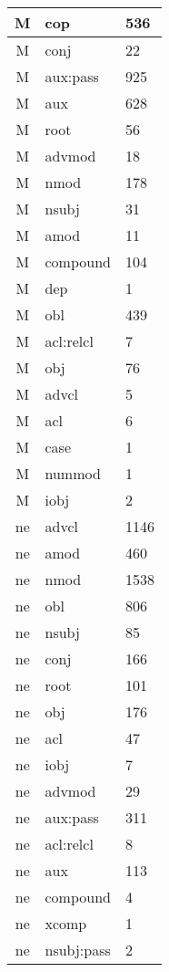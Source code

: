 \documentclass[a4 paper]{article}
\begin{document}
\begin{longtable}{cp{}p{}}
M & cop & 536\\ \midrule M & conj & 22\\ \midrule M & aux:pass & 925\\ \midrule M & aux & 628\\ \midrule M & root & 56\\ \midrule M & advmod & 18\\ \midrule M & nmod & 178\\ \midrule M & nsubj & 31\\ \midrule M & amod & 11\\ \midrule M & compound & 104\\ \midrule M & dep & 1\\ \midrule M & obl & 439\\ \midrule M & acl:relcl & 7\\ \midrule M & obj & 76\\ \midrule M & advcl & 5\\ \midrule M & acl & 6\\ \midrule M & case & 1\\ \midrule M & nummod & 1\\ \midrule M & iobj & 2\\ \midrule 
ne & advcl & 1146\\ \midrule ne & amod & 460\\ \midrule ne & nmod & 1538\\ \midrule ne & obl & 806\\ \midrule ne & nsubj & 85\\ \midrule ne & conj & 166\\ \midrule ne & root & 101\\ \midrule ne & obj & 176\\ \midrule ne & acl & 47\\ \midrule ne & iobj & 7\\ \midrule ne & advmod & 29\\ \midrule ne & aux:pass & 311\\ \midrule ne & acl:relcl & 8\\ \midrule ne & aux & 113\\ \midrule ne & compound & 4\\ \midrule ne & xcomp & 1\\ \midrule ne & nsubj:pass & 2\\ \midrule 

\end{longtable}
\end{document}
